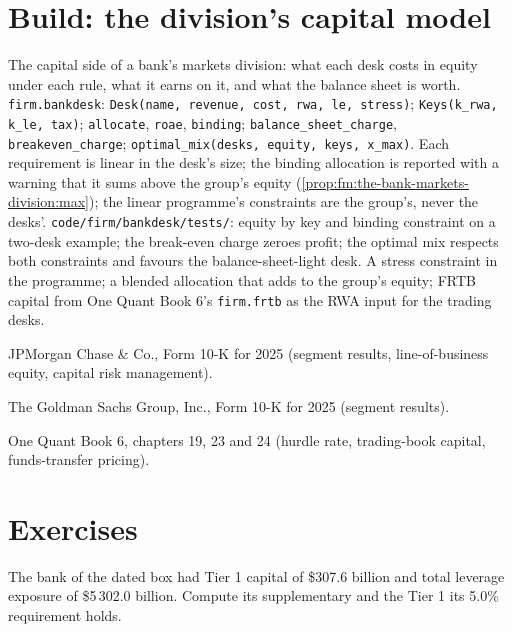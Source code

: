 \section{Build: the division's capital model}\label{bld:fm:the-bank-markets-division:bankdesk}

\begin{build}
 The capital side of a bank's markets division: what each desk costs in equity under each rule, what it earns on it, and what the
balance sheet is worth.
 \texttt{firm.bankdesk}: \texttt{Desk(name, revenue, cost, rwa, le, stress)}; \texttt{Keys(k\_rwa, k\_le, tax)};
\texttt{allocate}, \texttt{roae}, \texttt{binding}; \texttt{balance\_sheet\_charge}, \texttt{breakeven\_charge};
\texttt{optimal\_mix(desks, equity, keys, x\_max)}.
 Each requirement is linear in the desk's size; the binding allocation is reported with a warning that it sums above the group's
equity (\cref{prop:fm:the-bank-markets-division:max}); the linear programme's constraints are the group's, never the desks'.
 \texttt{code/firm/bankdesk/tests/}: equity by key and binding constraint on a two-desk example; the break-even charge
zeroes profit; the optimal mix respects both constraints and favours the balance-sheet-light desk.
 A stress constraint in the programme; a blended allocation that adds to the group's equity; FRTB capital from One Quant Book 6's
\texttt{firm.frtb} as the RWA input for the trading desks.
\end{build}

\begin{omsources}
\item JPMorgan Chase \& Co., Form 10-K for 2025 (segment results, line-of-business equity, capital risk management).
\item The Goldman Sachs Group, Inc., Form 10-K for 2025 (segment results).
\item One Quant Book 6, chapters 19, 23 and 24 (hurdle rate, trading-book capital, funds-transfer pricing).
\end{omsources}

\section{Exercises}

\begin{exercise}[$\star$]\label{exo:fm:the-bank-markets-division:1}
The bank of the dated box had Tier 1 capital of \$307.6 billion and total leverage exposure of \$5\,302.0 billion. Compute its supplementary  and the Tier 1 its 5.0\% requirement holds.
\end{exercise}

